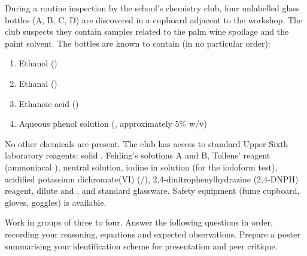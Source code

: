 \documentclass[11pt]{article}
\newcounter{popsec}
\newcounter{popsub}
\newcommand{\courssub}[1]{%
  \stepcounter{popsub}%
  \par\vspace{9pt}\noindent{\popxbold\fontsize{11.5}{13}\selectfont\color{popink}{\color{poporange}\thepopsec.\thepopsub}\hspace{6pt}#1}\par\nopagebreak\vspace{4pt}
}
\begin{document}
During a routine inspection by the school's chemistry club, four unlabelled glass bottles (A, B, C, D) are discovered in a cupboard adjacent to the workshop. The club suspects they contain samples related to the palm wine spoilage and the paint solvent. The bottles are known to contain (in no particular order):
\begin{enumerate}
    \item Ethanol ()
    \item Ethanal ()
    \item Ethanoic acid ()
    \item Aqueous phenol solution (, approximately $5\%$ w/v)
\end{enumerate}
No other chemicals are present. The club has access to standard Upper Sixth laboratory reagents: solid , Fehling's solutions A and B, Tollens' reagent (ammoniacal ), neutral  solution, iodine in  solution (for the iodoform test), acidified potassium dichromate(VI) (/), 2,4-dinitrophenylhydrazine (2,4-DNPH) reagent, dilute  and , and standard glassware. Safety equipment (fume cupboard, gloves, goggles) is available.

\courssub{Tasks}
Work in groups of three to four. Answer the following questions in order, recording your reasoning, equations and expected observations. Prepare a poster summarising your identification scheme for presentation and peer critique.
\end{document}
